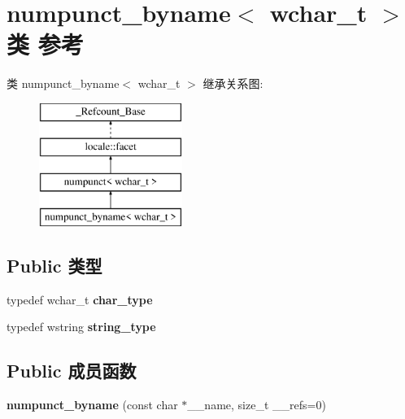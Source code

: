 \hypertarget{classnumpunct__byname_3_01wchar__t_01_4}{}\section{numpunct\+\_\+byname$<$ wchar\+\_\+t $>$类 参考}
\label{classnumpunct__byname_3_01wchar__t_01_4}
类 numpunct\+\_\+byname$<$ wchar\+\_\+t $>$ 继承关系图\+:\begin{figure}[H]
\begin{center}
\leavevmode
\includegraphics[height=4.000000cm]{classnumpunct__byname_3_01wchar__t_01_4}
\end{center}
\end{figure}
\subsection*{Public 类型}
\begin{DoxyCompactItemize}
\item 
\mbox{\label{classnumpunct__byname_3_01wchar__t_01_4_a9f2c885414f50a132f02d29bee628502}} 
typedef wchar\+\_\+t {\bfseries char\+\_\+type}
\item 
\mbox{\label{classnumpunct__byname_3_01wchar__t_01_4_a0d7319e4875d182e5a83e77aa12ea28e}} 
typedef wstring {\bfseries string\+\_\+type}
\end{DoxyCompactItemize}
\subsection*{Public 成员函数}
\begin{DoxyCompactItemize}
\item 
\mbox{\label{classnumpunct__byname_3_01wchar__t_01_4_a861d4958933ae952b07acba88134920a}} 
{\bfseries numpunct\+\_\+byname} (const char $\ast$\+\_\+\+\_\+name, size\+\_\+t \+\_\+\+\_\+refs=0)
\end{DoxyCompactItemize}
